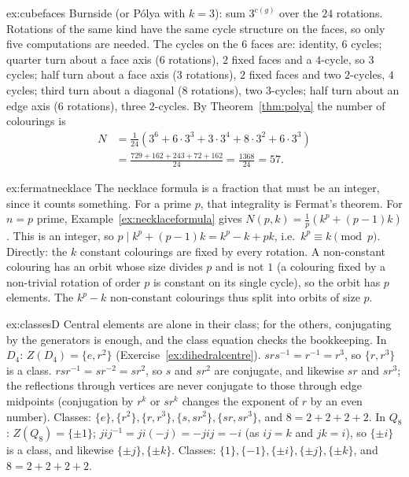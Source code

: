 \begin{solution}{ex:cubefaces}
\idea Burnside (or P\'olya with $k=3$): sum $3^{c(g)}$ over the $24$ rotations. Rotations of the same kind have the same cycle structure on the faces, so only five computations are needed.
\writeup The cycles on the $6$ faces are: identity, $6$ cycles; quarter turn about a face axis ($6$ rotations), $2$ fixed faces and a $4$-cycle, so $3$ cycles; half turn about a face axis ($3$ rotations), $2$ fixed faces and two $2$-cycles, $4$ cycles; third turn about a diagonal ($8$ rotations), two $3$-cycles; half turn about an edge axis ($6$ rotations), three $2$-cycles. By Theorem~\ref{thm:polya} the number of colourings is
\[
\begin{aligned}
N&=\frac1{24}\left(3^6+6\cdot3^3+3\cdot3^4+8\cdot3^2+6\cdot3^3\right)\\
&=\frac{729+162+243+72+162}{24}=\frac{1368}{24}=57.
\end{aligned}
\]
\end{solution}

\begin{solution}{ex:fermatnecklace}
\idea The necklace formula is a fraction that must be an integer, since it counts something. For a prime $p$, that integrality is Fermat's theorem.
\writeup For $n=p$ prime, Example~\ref{ex:necklaceformula} gives $N(p,k)=\frac1p\left(k^p+(p-1)k\right)$. This is an integer, so $p\mid k^p+(p-1)k=k^p-k+pk$, i.e.\ $k^p\equiv k\pmod p$.
Directly: the $k$ constant colourings are fixed by every rotation. A non-constant colouring has an orbit whose size divides $p$ and is not $1$ (a colouring fixed by a non-trivial rotation of order $p$ is constant on its single cycle), so the orbit has $p$ elements. The $k^p-k$ non-constant colourings thus split into orbits of size $p$.
\end{solution}

\begin{solution}{ex:classesD}
\idea Central elements are alone in their class; for the others, conjugating by the generators is enough, and the class equation checks the bookkeeping.
\writeup In $D_4$: $Z(D_4)=\{e,r^2\}$ (Exercise~\ref{ex:dihedralcentre}). $srs^{-1}=r^{-1}=r^3$, so $\{r,r^3\}$ is a class. $rsr^{-1}=sr^{-2}=sr^2$, so $s$ and $sr^2$ are conjugate, and likewise $sr$ and $sr^3$; the reflections through vertices are never conjugate to those through edge midpoints (conjugation by $r^k$ or $sr^k$ changes the exponent of $r$ by an even number). Classes: $\{e\},\{r^2\},\{r,r^3\},\{s,sr^2\},\{sr,sr^3\}$, and $8=2+2+2+2$.
In $Q_8$: $Z(Q_8)=\{\pm1\}$; $jij^{-1}=ji(-j)=-jij=-i$ (as $ij=k$ and $jk=i$), so $\{\pm i\}$ is a class, and likewise $\{\pm j\},\{\pm k\}$. Classes: $\{1\},\{-1\},\{\pm i\},\{\pm j\},\{\pm k\}$, and $8=2+2+2+2$.
\end{solution}

